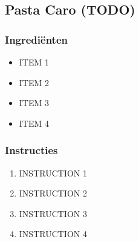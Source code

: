 \subsection{Pasta Caro (TODO)}
\subsubsection*{Ingrediënten}
\begin{multicols}{2}
    \begin{itemize}
        \item ITEM 1
        \item ITEM 2
        \item ITEM 3
        \item ITEM 4
    \end{itemize}
\end{multicols}

\subsubsection*{Instructies}
\begin{multicols}{2}
    \begin{enumerate}
        \item INSTRUCTION 1
        \item INSTRUCTION 2
        \item INSTRUCTION 3
        \item INSTRUCTION 4
    \end{enumerate}
\end{multicols}